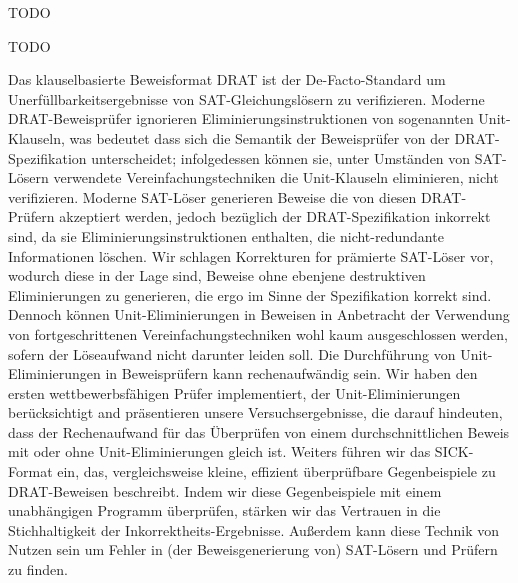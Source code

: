 \documentclass[draft,final]{vutinfth} %
\begin{document}
\frontmatter %

\addstatementpage

\begin{danksagung*}
    TODO
\end{danksagung*}

\begin{acknowledgements*}
    TODO
\end{acknowledgements*}
\fi

\begin{kurzfassung}

Das klauselbasierte Beweisformat DRAT ist der De-Facto-Standard um
Unerfüllbarkeitsergebnisse von SAT-Gleichungslösern zu verifizieren.
Moderne DRAT-Beweisprüfer ignorieren Eliminierungsinstruktionen
von sogenannten Unit-Klauseln, was bedeutet dass sich die Semantik der
Beweisprüfer von der DRAT-Spezifikation unterscheidet; infolgedessen können
sie, unter Umständen von SAT-Lösern verwendete Vereinfachungstechniken die
Unit-Klauseln eliminieren, nicht verifizieren.  Moderne SAT-Löser generieren
Beweise die von diesen DRAT-Prüfern akzeptiert werden, jedoch bezüglich der
DRAT-Spezifikation inkorrekt sind, da sie Eliminierungsinstruktionen enthalten,
die nicht-redundante Informationen löschen.  Wir schlagen Korrekturen for
prämierte SAT-Löser vor, wodurch diese in der Lage sind, Beweise ohne
ebenjene destruktiven Eliminierungen zu generieren, die ergo im Sinne der
Spezifikation korrekt sind. Dennoch können Unit-Eliminierungen in Beweisen
in Anbetracht der Verwendung von fortgeschrittenen Vereinfachungstechniken
wohl kaum ausgeschlossen werden, sofern der Löseaufwand nicht darunter
leiden soll.  Die Durchführung von Unit-Eliminierungen in Beweisprüfern
kann rechenaufwändig sein.  Wir haben den ersten wettbewerbsfähigen Prüfer
implementiert, der Unit-Eliminierungen berücksichtigt and präsentieren
unsere Versuchsergebnisse, die darauf hindeuten, dass der Rechenaufwand
für das Überprüfen von einem durchschnittlichen Beweis mit oder ohne
Unit-Eliminierungen gleich ist.  Weiters führen wir das SICK-Format ein,
das, vergleichsweise kleine, effizient überprüfbare Gegenbeispiele
zu DRAT-Beweisen beschreibt. Indem wir diese Gegenbeispiele mit einem
unabhängigen Programm überprüfen, stärken wir das Vertrauen in die
Stichhaltigkeit der Inkorrektheits-Ergebnisse.  Außerdem kann diese Technik
von Nutzen sein um Fehler in (der Beweisgenerierung von) SAT-Lösern und
Prüfern zu finden.

\end{kurzfassung}
\end{document}
